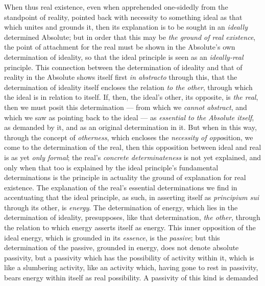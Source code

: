 \documentclass[12pt,a4paper]{book}
\begin{document}
When thus real existence, even when apprehended one-sidedly from the
standpoint of reality, pointed back with necessity to something ideal as that
which unites and grounds it, then its explanation is to be sought in an
\emph{ideally} determined Absolute; but in order that this may be \emph{the
ground of real existence}, the point of attachment for the real must be shown
in the Absolute's own determination of ideality, so that the ideal principle
is seen as an \emph{ideally-real} principle. This connection between the
determination of ideality and that of reality in the Absolute shows itself
first \emph{\textit{in abstracto}}
through this, that the determination of ideality itself encloses the relation
\emph{to the other}, through which the ideal is in relation to itself. If,
then, the ideal's other, its opposite, is \emph{the real}, then we must posit
this determination --- from which we \emph{cannot abstract}, and which we saw
as pointing back to the ideal --- as \emph{essential to the Absolute itself},
as demanded by it, and as an original determination in it. But when in this
way, through the concept of \emph{otherness}, which encloses the
\emph{necessity of oppo}sition, we come to the determination of the real, then
this opposition between ideal and real is as yet \emph{only formal}; the
real's \emph{concrete determinateness} is not yet explained, and only when
that too is explained by the ideal principle's fundamental determinations is
the principle in actuality the ground of explanation for real existence. The
explanation of the real's essential determinations we find in accentuating
that the ideal principle, as such, in asserting itself as \textit{principium
sui} through its other, is \emph{energy}. The determination of energy, which
lies in the determination of ideality, presupposes, like that determination,
\emph{the other}, through the relation to which energy asserts itself as
energy. This inner opposition of the ideal energy, which is grounded in its
\emph{essence}, is the \emph{passive}; but this determination of the passive,
grounded in energy, does not denote absolute passivity, but a passivity which
has the possibility of activity within it, which is like a slumbering
activity, like an activity which, having gone to rest in passivity, bears
energy within itself as real possibility. A passivity of this kind is demanded
\end{document}
